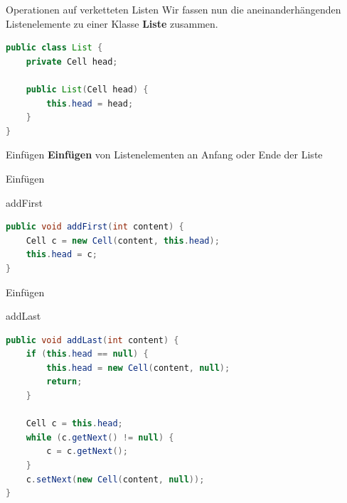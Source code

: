 \documentclass[18pt]{beamer}
\begin{document}
\begin{frame}[fragile]{Operationen auf verketteten Listen}
    Wir fassen nun die aneinanderhängenden Listenelemente zu einer Klasse \textbf{Liste} zusammen.

    \begin{exampleblock}{}
        \begin{lstlisting}[language=Java,basicstyle=\scriptsize]
public class List {
    private Cell head;

    public List(Cell head) {
        this.head = head;
    }
}
        \end{lstlisting}

    \end{exampleblock}


\end{frame}

\begin{frame}{Einfügen}
    \textbf{Einfügen} von Listenelementen an Anfang oder Ende der Liste
\end{frame}


\begin{frame}[fragile]{Einfügen}
    \begin{exampleblock}{addFirst}
        \begin{lstlisting}[language=Java,basicstyle=\scriptsize]
public void addFirst(int content) {
    Cell c = new Cell(content, this.head);
    this.head = c;
}
        \end{lstlisting}

    \end{exampleblock}

\end{frame}

\begin{frame}[fragile]{Einfügen}

    \begin{exampleblock}{addLast}
        \begin{lstlisting}[language=Java,basicstyle=\scriptsize]
public void addLast(int content) {
    if (this.head == null) {
        this.head = new Cell(content, null);
        return;
    }

    Cell c = this.head;
    while (c.getNext() != null) {
        c = c.getNext();
    }
    c.setNext(new Cell(content, null));
}
        \end{lstlisting}

    \end{exampleblock}

\end{frame}
\end{document}
